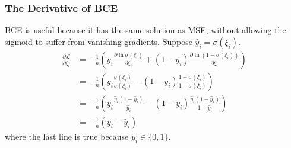 \documentclass{beamer}
\begin{document}
\begin{frame}
  \frametitle{The Derivative of BCE}

  BCE is useful because it has the same solution as MSE, without
  allowing the sigmoid to suffer from vanishing gradients.  Suppose
  $\hat{y}_i=\sigma(\xi_i)$.
  \begin{align*}
    \frac{\partial{\mathcal L}}{\partial\xi_i}
    &=
    -\frac{1}{n}
    \left(y_i\frac{\partial\ln\sigma(\xi_i)}{\partial\xi_i}
    +(1-y_i)\frac{\partial\ln(1-\sigma(\xi_i))}{\partial\xi_i}\right)\\
    &=
    -\frac{1}{n}
    \left(y_i\frac{\dot\sigma(\xi_i)}{\sigma(\xi_i)}-
    (1-y_i)\frac{1-\dot\sigma(\xi_i)}{1-\sigma(\xi_i)}\right)\\
    &=
    -\frac{1}{n}
    \left(y_i\frac{\hat{y}_i(1-\hat{y}_i)}{\hat{y}_i}
    -(1-y_i)\frac{\hat{y}_i(1-\hat{y}_i)}{1-\hat{y}_i}
    \right)\\
    &=
    -\frac{1}{n}
    \left(y_i-\hat{y}_i\right)
  \end{align*}
  where the last line is true because $y_i\in\{0,1\}$.
\end{frame}
\end{document}
